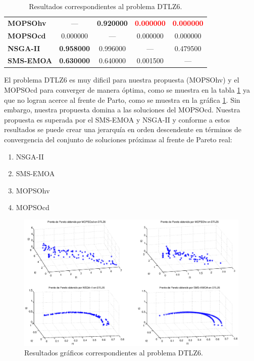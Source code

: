 \begin{table}
\begin{center}
\begin{tabular}{|l|cc|cc|}
	\textbf{MOPSOhv} & --- &  \textbf{0.920000}       &  \textbf{\textcolor{red}{0.000000}}  &  \textbf{\textcolor{red}{0.000000}} \\ 
	\textbf{MOPSOcd} & 0.000000 & ---       &  0.000000 &  0.000000  \\ 
	\textbf{NSGA-II} & \textbf{0.958000} & 0.996000  & ---       & 0.479500  \\  
	\textbf{SMS-EMOA}& \textbf{0.630000} &  0.640000 & 0.001500  & --- \\  
	\hline
	\end{tabular}
\caption{Resultados correspondientes al problema DTLZ6.}
  \label{tab:dtlz6}
\end{center}
\end{table}
El problema DTLZ6 es muy dificil para nuestra propuesta (MOPSOhv) y el MOPSOcd para converger de manera \'optima, como se muestra en la 
tabla \ref{tab:dtlz6} ya que no logran acerce al frente de Parto, como se muestra en la gr\'afica \ref{fig:rDTLZ6}. Sin embargo, nuestra 
propuesta domina a las soluciones del MOPSOcd. Nuestra propuesta es superada por el SMS-EMOA y NSGA-II y conforme a estos resultados se puede 
crear una jerarqu\'ia en orden descendente en t\'erminos de convergencia del conjunto de soluciones pr\'oximas al frente de Pareto real:

\begin{enumerate}
  \item NSGA-II
  \item SMS-EMOA
  \item MOPSOhv
  \item MOPSOcd
\end{enumerate}

\clearpage
\newpage
\begin{figure}
      \begin{center}
	  \includegraphics[scale=0.45]{Cap4/rdtlz6r.eps}
      \end{center}
	\caption{Resultados gr\'aficos correspondientes al problema DTLZ6.}
      \label{fig:rDTLZ6}
      \end{figure}
\clearpage
\newpage

